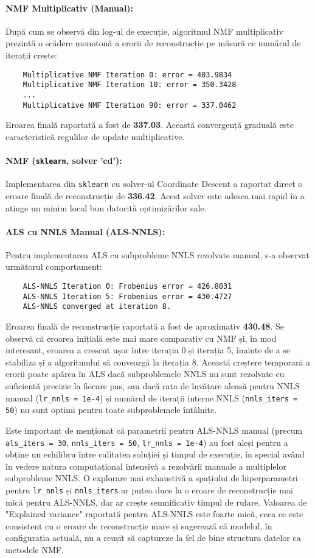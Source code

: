 \documentclass[12pt,a4paper]{article}
\begin{document}
\paragraph{NMF Multiplicativ (Manual):}
După cum se observă din log-ul de execuție, algoritmul NMF multiplicativ prezintă o scădere monotonă a erorii de reconstrucție pe măsură ce numărul de iterații crește:
\begin{verbatim}
	Multiplicative NMF Iteration 0: error = 403.9834
	Multiplicative NMF Iteration 10: error = 350.3428
	...
	Multiplicative NMF Iteration 90: error = 337.0462
\end{verbatim}
Eroarea finală raportată a fost de \textbf{337.03}. Această convergență graduală este caracteristică regulilor de update multiplicative.

\paragraph{NMF (\texttt{sklearn}, solver 'cd'):}
Implementarea din \texttt{sklearn} cu solver-ul Coordinate Descent a raportat direct o eroare finală de reconstrucție de \textbf{336.42}. Acest solver este adesea mai rapid în a atinge un minim local bun datorită optimizărilor sale.

\paragraph{ALS cu NNLS Manual (ALS-NNLS):}
Pentru implementarea ALS cu subprobleme NNLS rezolvate manual, s-a observat următorul comportament:
\begin{verbatim}
	ALS-NNLS Iteration 0: Frobenius error = 426.8031
	ALS-NNLS Iteration 5: Frobenius error = 430.4727
	ALS-NNLS converged at iteration 8.
\end{verbatim}
Eroarea finală de reconstrucție raportată a fost de aproximativ \textbf{430.48}. Se observă că eroarea inițială este mai mare comparativ cu NMF și, în mod interesant, eroarea a crescut ușor între iterația 0 și iterația 5, înainte de a se stabiliza și a algoritmului să conveargă la iterația 8. Această creștere temporară a erorii poate apărea în ALS dacă subproblemele NNLS nu sunt rezolvate cu suficientă precizie la fiecare pas, sau dacă rata de învățare aleasă pentru NNLS manual (\texttt{lr\_nnls = 1e-4}) și numărul de iterații interne NNLS (\texttt{nnls\_iters = 50}) nu sunt optimi pentru toate subproblemele întâlnite.

Este important de menționat că parametrii pentru ALS-NNLS manual (precum \texttt{als\_iters = 30}, \texttt{nnls\_iters = 50}, \texttt{lr\_nnls = 1e-4}) au fost aleși pentru a obține un echilibru între calitatea soluției și timpul de execuție, în special având în vedere natura computațional intensivă a rezolvării manuale a multiplelor subprobleme NNLS. O explorare mai exhaustivă a spațiului de hiperparametri pentru \texttt{lr\_nnls} și \texttt{nnls\_iters} ar putea duce la o eroare de reconstrucție mai mică pentru ALS-NNLS, dar ar crește semnificativ timpul de rulare. Valoarea de "Explained variance" raportată pentru ALS-NNLS este foarte mică, ceea ce este consistent cu o eroare de reconstrucție mare și sugerează că modelul, în configurația actuală, nu a reușit să captureze la fel de bine structura datelor ca metodele NMF.
\end{document}

